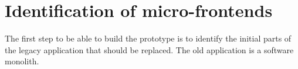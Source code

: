 \section{Identification of micro-frontends}\label{section:applied-methods:identification-micro-frontends}

The first step to be able to build the prototype is to identify the initial parts of the legacy application that should be replaced. The old application is a software monolith. 